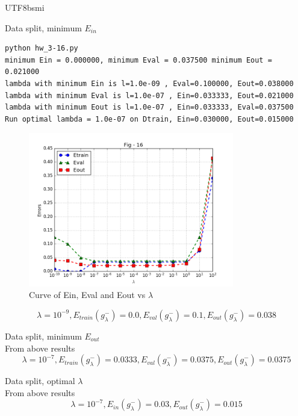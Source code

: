 \documentclass[12pt]{article}
\newenvironment{prob}[2][Prob.]{\begin{trivlist}
\item[\hskip \labelsep {\bfseries #1}\hskip \labelsep {\bfseries #2}]}{\end{trivlist}}
\begin{document}
\begin{CJK}{UTF8}{bsmi}
\begin{prob}{16} Data split, minimum $E_{in}$\\
\begin{lstlisting}
python hw_3-16.py
minimum Ein = 0.000000, minimum Eval = 0.037500 minimum Eout = 0.021000
lambda with minimum Ein is l=1.0e-09 , Eval=0.100000, Eout=0.038000
lambda with minimum Eval is l=1.0e-07 , Ein=0.033333, Eout=0.021000
lambda with minimum Eout is l=1.0e-07 , Ein=0.033333, Eval=0.037500
Run optimal lambda = 1.0e-07 on Dtrain, Ein=0.030000, Eout=0.015000
\end{lstlisting}
\begin{figure}[H]
	\centering
	\includegraphics[width=0.8\textwidth]{../results/figure_16.png}
	\caption{Curve of Ein, Eval and Eout vs $\lambda$}
\end{figure}
\[
    \lambda = 10^{-9}, E_{train}(g^-_\lambda) = 0.0, E_{val}(g^-_\lambda) = 0.1, E_{out}(g^-_\lambda) = 0.038
\]
\end{prob}

\begin{prob}{17} Data split, minimum $E_{out}$\\
From above results
\[
    \lambda = 10^{-7}, E_{train}(g^-_\lambda) = 0.0333, E_{val}(g^-_\lambda) = 0.0375, E_{out}(g^-_\lambda) = 0.0375
\]
\end{prob}

\begin{prob}{18} Data split, optimal $\lambda$\\
From above results
\[
    \lambda = 10^{-7}, E_{in}(g^-_\lambda) = 0.03, E_{out}(g^-_\lambda) = 0.015
\]
\end{prob}


\end{CJK}
\end{document}
